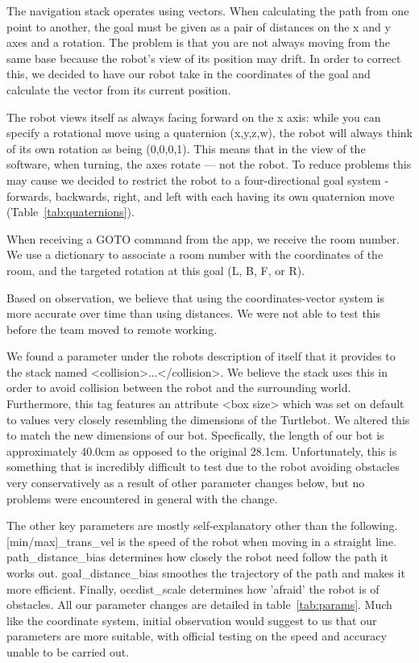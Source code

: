 \documentclass{article}
\begin{document}
The navigation stack operates using vectors. When calculating the path from one point to another, the goal must be given as a pair of distances on the x and y axes and a rotation. The problem is that you are not always moving from the same base because the robot's view of its position may drift. In order to correct this, we decided to have our robot take in the coordinates of the goal and calculate the vector from its current position.

The robot views itself as always facing forward on the x axis: while you can specify a rotational move using a quaternion (x,y,z,w), the robot will always think of its own rotation as being (0,0,0,1). This means that in the view of the software, when turning, the axes rotate --- not the robot. To reduce problems this may cause we decided to restrict the robot to a four-directional goal system - forwards, backwards, right, and left with each having its own quaternion move (Table~\ref{tab:quaternions}).

When receiving a GOTO command from the app, we receive the room number. We use a dictionary to associate a room number with the coordinates of the room, and the targeted rotation at this goal (L, B, F, or R).

Based on observation, we believe that using the coordinates-vector system is more accurate over time than using distances. We were not able to test this before the team moved to remote working. 

We found a parameter under the robots description of itself that it provides to the stack named <collision>...</collision>. We believe the stack uses this in order to avoid collision between the robot and the surrounding world. Furthermore, this tag features an attribute <box size> which was set on default to values very closely resembling the dimensions of the Turtlebot. We altered this to match the new dimensions of our bot. Specfically, the length of our bot is approximately 40.0cm as opposed to the original 28.1cm. Unfortunately, this is something that is incredibly difficult to test due to the robot avoiding obstacles very conservatively as a result of other parameter changes below, but no problems were encountered in general with the change.

The other key parameters are mostly self-explanatory other than the following. [min/max]\_trans\_vel is the speed of the robot when moving in a straight line. path\_distance\_bias determines how closely the robot need follow the path it works out. goal\_distance\_bias smoothes the trajectory of the path and makes it more efficient. Finally, occdist\_scale determines how 'afraid' the robot is of obstacles. All our parameter changes are detailed in table~\ref{tab:params}. Much like the coordinate system, initial observation would suggest to us that our parameters are more suitable, with official testing on the speed and accuracy unable to be carried out.
\end{document}
